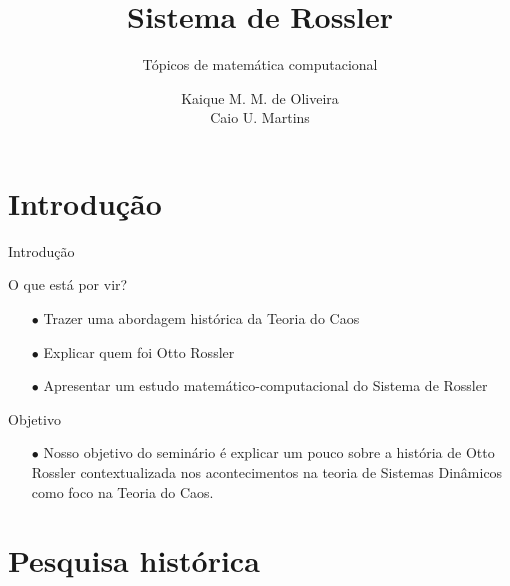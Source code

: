 \documentclass{beamer}
\title{Sistema de Rossler}
\subtitle{Tópicos de matemática computacional}
\author[]{Kaique M. M. de Oliveira \\ Caio U. Martins}
\begin{document}
	\typesetFrontSlides



\section{Introdução}


\begin{frame}{Introdução}

    \begin{exampleblock}{O que está por vir?}
    	\begin{itemize}
    	\item [$\bullet$] Trazer uma abordagem histórica da Teoria do Caos
		\item [$\bullet$] Explicar quem foi Otto Rossler
		\item [$\bullet$] Apresentar um estudo matemático-computacional do Sistema de 	Rossler 
		\end{itemize}
    \end{exampleblock}
    
        \begin{exampleblock}{Objetivo}
    	\begin{itemize}
		\item [$\bullet$] Nosso objetivo do seminário é explicar um pouco sobre a história de Otto Rossler contextualizada nos acontecimentos na teoria de Sistemas Dinâmicos como foco na Teoria do Caos.
    	\end{itemize}
    \end{exampleblock}
    
\end{frame}



\section{Pesquisa histórica}
\end{document}
